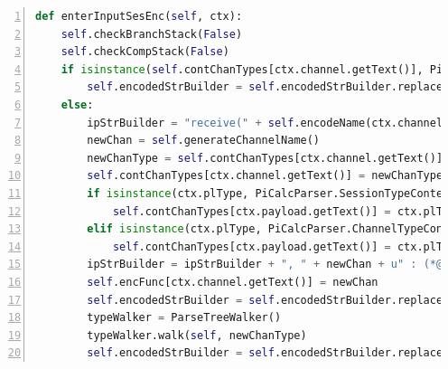 \documentclass{l4proj}
\begin{document}
\begin{lstlisting}[language=Python, float=p, caption={\texttt{enterInputSesEnc}, the function used to encode a session-typed input process. \texttt{ctx} is the ANTLR context of the current instance of the grammar rule. It is the object containing everthing found within this instance, such as the ANLTR contexts of instances of other grammar rules that appear within this instance's rule. \texttt{self.checkBranchStack} and \texttt{self.checkCompStack} check whether the current process is the initial process in the continuation of a branch or an arm of a parallel composition respectively and the encoding function or list of existing variable names should therefore be reset. These functions are both passed a parameter \texttt{False} to indicate the current process is not a branch or composition respectively. The \texttt{if} statement checks if the input process uses a standard channel, and gives a simpler encoding if so. The {else} clause generates a new channel name, updates \texttt{contChanTypes}, adds the payload to \texttt{contChanTypes} if it is a channel, adds the new channel to the encoding function and adds the encoded string to the string builder. It then encodes the type of the newly generated type annotation. $\CIRCLE$ is used as a placeholder for processes, $\blacktriangle$ is used as a placeholder for types and $\star$ is used so that type annotations are inserted in the correct order.}, label={lst:encCode}, extendedchars=True, numbers=left]
def enterInputSesEnc(self, ctx):
	self.checkBranchStack(False)
	self.checkCompStack(False)
	if isinstance(self.contChanTypes[ctx.channel.getText()], PiCalcParser.ChannelTypeContext):
		self.encodedStrBuilder = self.encodedStrBuilder.replace(u"(*@$\CIRCLE$@*)", "receive(" + ctx.channel.getText() + ", " + ctx.payload.getText() + u" : (*@$\blacktriangle$@*)).(*@$\CIRCLE$@*)", 1)
	else:
		ipStrBuilder = "receive(" + self.encodeName(ctx.channel.getText()) + ", " + ctx.payload.getText() + u" : (*@$\star$@*)"
		newChan = self.generateChannelName()
		newChanType = self.contChanTypes[ctx.channel.getText()].sType()
		self.contChanTypes[ctx.channel.getText()] = newChanType
		if isinstance(ctx.plType, PiCalcParser.SessionTypeContext):
			self.contChanTypes[ctx.payload.getText()] = ctx.plType.sType()
		elif isinstance(ctx.plType, PiCalcParser.ChannelTypeContext):
			self.contChanTypes[ctx.payload.getText()] = ctx.plType
		ipStrBuilder = ipStrBuilder + ", " + newChan + u" : (*@$\blacktriangle$@*)).(*@$\CIRCLE$@*)"
		self.encFunc[ctx.channel.getText()] = newChan
		self.encodedStrBuilder = self.encodedStrBuilder.replace(u"(*@\CIRCLE@*)", ipStrBuilder, 1)
		typeWalker = ParseTreeWalker()
		typeWalker.walk(self, newChanType)
		self.encodedStrBuilder = self.encodedStrBuilder.replace(u"(*@$\star$@*)", u"(*@$\blacktriangle$@*)", 1)
\end{lstlisting}
\end{document}
